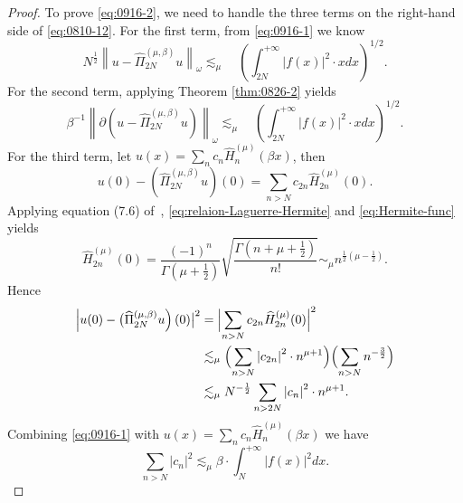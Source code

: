 \documentclass[pdflatex,sn-aps]{sn-jnl}%
\theoremstyle{thmstyleone}%
\theoremstyle{thmstyletwo}%
\theoremstyle{thmstylethree}%
\begin{document}
\begin{proof}
  To prove \eqref{eq:0916-2}, we need to handle the three terms on the right-hand side of \eqref{eq:0810-12}.
  For the first term, from \eqref{eq:0916-1} we know
  \begin{equation}\label{eq:0916-5}
    N^{\frac{1}{2}}\left\|u-\widehat{\Pi}_{2 N}^{(\mu, \beta)} u\right\|_\omega \lesssim_\mu \quad\left(\int_{2 N}^{+\infty} \left|f(x)\right|^2 \cdot x d x\right)^{1 / 2}.
  \end{equation}
  For the second term, applying Theorem \ref{thm:0826-2} yields
  \begin{equation}\label{eq:0916-6}
    \beta^{-1}\left\|\partial\left(u-\widehat{\Pi}_{2 N}^{(\mu, \beta)} u\right)\right\|_\omega \lesssim_\mu \quad\left(\int_{2 N}^{+\infty} \left|f(x)\right|^2 \cdot x d x\right)^{1 / 2}.
  \end{equation}
  For the third term, let $u(x) = \sum_n c_n \widehat{H}_n^{(\mu)}(\beta x)$,
  then
  \begin{equation}\label{eq:0916-6.5}
    u(0)-\left(\widehat{\Pi}_{2 N}^{(\mu, \beta)} u\right)(0) = \sum_{n > N} c_{2n} \widehat{H}_{2n}^{(\mu)}(0).
  \end{equation}
  Applying equation (7.6) of~\cite{shen2011spectral}, \eqref{eq:relaion-Laguerre-Hermite} and \eqref{eq:Hermite-func} yields
  \begin{equation}\label{eq:0916-7}
    \widehat{H}_{2 n}^{(\mu)}(0)=\frac{(-1)^n}{\Gamma\left(\mu+\frac{1}{2}\right)} \sqrt{\frac{\Gamma\left(n+\mu+\frac{1}{2}\right)}{n!}} \sim_\mu n^{\frac{1}{2}\left(\mu-\frac{1}{2}\right)}.
  \end{equation}
  Hence
  \begin{equation}\label{eq:0916-8}
    \begin{aligned}
    \left|u(0)-\bigl(\widehat{\Pi}_{2 N}^{(\mu, \beta)} u\right)(0)\bigr|^2 
    & =\Bigl|\sum_{n>N} c_{2 n} \widehat{H}_{2 n}^{(\mu)}(0)\Bigr|^2 \\
    & \lesssim_\mu\Bigl(\sum_{n>N}\left|c_{2 n}\right|^2 \cdot n^{\mu+1}\Bigr)\Bigl(\sum_{n>N} n^{-\frac{3}{2}}\Bigr) \\
    & \lesssim_\mu N^{-\frac{1}{2}} \sum_{n > 2N}\left|c_n\right|^2 \cdot n^{\mu+1}.
    \end{aligned}
  \end{equation}
  Combining \eqref{eq:0916-1} with $u(x) = \sum_n c_n \widehat{H}_n^{(\mu)}(\beta x)$ we have
  \begin{equation}\label{eq:0916-9}
    \sum_{n>N}\left|c_n\right|^2 \lesssim_\mu \beta \cdot \int_N^{+\infty} \left|f(x)\right|^2 d x.

\end{equation}
\end{proof}
\end{document}
